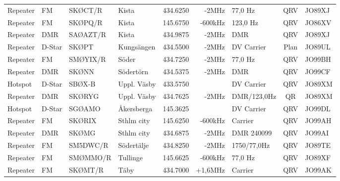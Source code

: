 \documentclass[10pt,swedish,a4paper,twoside]{article}
\begin{document}
\begin{landscape}
\begin{longtable}{llllrrlcl}
	Repeater          & FM           & SKØCT/R       & Kista        &          434.6250 &          -2MHz & 77,0 Hz         &       QRV       & JO89XJ           \\
	Repeater          & FM           & SKØPQ/R       & Kista        &          145.6750 &        -600kHz & 123,0 Hz        &       QRV       & JO86XV           \\
	Repeater          & DMR          & SAØAZT/R      & Kista        &          434.9875 &          -2MHz & DMR             &       QRV       & JO89XJ           \\
	Repeater          & D-Star       & SKØPT         & Kungsängen   &          434.5500 &          -2MHz & DV Carrier      &      Plan       & JO89UL           \\
	Repeater          & FM           & SMØYIX/R      & Söder        &          434.7250 &          -2MHz & 77,0 Hz         &       QRV       & JO99BH           \\
	Repeater          & DMR          & SKØNN         & Södertörn    &          434.5375 &          -2MHz & DMR             &       QRV       & JO99CF           \\
	Hotspot           & D-Star       & SBØX-B        & Uppl. Väsby  &          433.5750 &                & DV Carrier      &       QRV       & JO89XM           \\
	Repeater          & DMR          & SKØRYG        & Uppl. Väsby  &          434.7625 &          -2MHz & DMR/123,0Hz    &       QR        & JO89XM           \\
	Hotspot           & D-Star       & SGØAMO        & Åkersberga   &          145.3625 &                & DV Carrier      &       QRV       & JO99DL           \\
	Repeater          & FM           & SKØRIX        & Sthlm city   &          145.6250 &        -600kHz & Carrier         &       QRV       & JO99AH           \\
	Repeater          & DMR          & SKØMG         & Sthlm city   &          434.6875 &          -2MHz & DMR 240099      &       QRV       & JO99AI           \\
	Repeater          & FM           & SM5DWC/R      & Södertälje   &          434.8250 &          -2MHz & 1750/77,0Hz    &       QRV       & JO89TE           \\
	Repeater          & FM           & SMØMMO/R      & Tullinge     &          145.6625 &        -600kHz & 77,0 Hz         &       QRV       & JO89XF           \\
	Repeater          & FM           & SKØMT/R       & Täby         &          434.7000 &        +1,6MHz & Carrier         &       QRV       & JO99AK           \\

\end{longtable}
\end{landscape}
\end{document}
